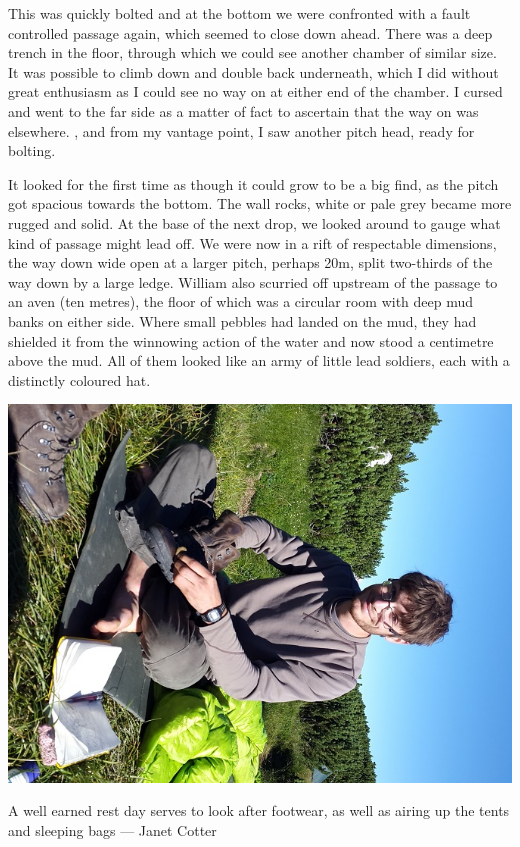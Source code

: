 This was quickly bolted and at the bottom we were confronted with a fault controlled passage again, which seemed to close down ahead. There was a deep trench in the floor, through which we could see another chamber of similar size. It was possible to climb down and double back underneath, which I did without great enthusiasm as I could see no way on at either end of the chamber. I cursed and went to the far side as a matter of fact to ascertain that the way on was elsewhere. , and from my vantage point, I saw another pitch head, ready for bolting. 

 It looked for the first time as though it could grow to be a big find, as the pitch got spacious towards the bottom. The wall rocks, white or pale grey became more rugged and solid. At the base of the next drop, we looked around to gauge what kind of passage might lead off. We were now in a rift of respectable dimensions, the way down wide open at a larger pitch, perhaps 20m, split two-thirds of the way down by a large ledge. William also scurried off upstream of the passage to an aven (ten metres), the floor of which was a circular room with deep mud banks on either side. Where small pebbles had landed on the mud, they had shielded it from the winnowing action of the water and now stood a centimetre above the mud. All of them looked like an army of little lead soldiers, each with a distinctly coloured hat. 

\begin{marginfigure} \centering
	\includegraphics[width=\linewidth]{images/2017/tanguy-alabaster-2017/packing_up_tanguy.jpg}
	\caption{A well earned rest day serves to look after footwear, as well as airing up the tents and sleeping bags --- Janet Cotter}
	\label{fig:clean shoes}
\end{marginfigure}

